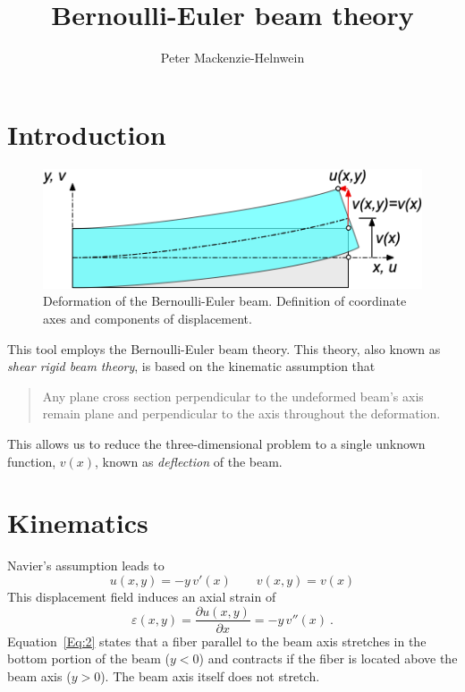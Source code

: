 \documentclass[11pt, oneside]{article}   	%
\title{Bernoulli-Euler beam theory}
\author{Peter Mackenzie-Helnwein}
\begin{document}
\maketitle

\section{Introduction}
\begin{figure}[h]
	\begin{center}
		\includegraphics[scale=0.50]{beam.png}
		\caption{Deformation of the Bernoulli-Euler beam. Definition of coordinate axes and components of displacement.}
	\end{center}
	\label{Fig:1}
\end{figure}
This tool employs the Bernoulli-Euler beam theory.  This theory, also known as \emph{shear rigid beam theory}, is based on the kinematic assumption  that
\begin{quote}
   Any plane cross section perpendicular to the undeformed beam's axis remain plane and perpendicular to the axis throughout the deformation.
\end{quote}
This allows us to reduce the three-dimensional problem to a single unknown function, $v(x)$, known as \emph{deflection} of the beam.

\section{Kinematics}
Navier's assumption leads to
\begin{equation}
	u(x,y) = -y \,v'(x)
	\qquad
	v(x,y) = v(x)
	\label{Eq:1}
\end{equation}
This displacement field induces an axial strain of
\begin{equation}
	\varepsilon(x,y) = \frac{\partial u(x,y)}{\partial x} = -y\, v''(x) ~.
	\label{Eq:2}
\end{equation}
Equation~\eqref{Eq:2} states that a fiber parallel to the beam axis stretches in the bottom portion of the beam ($y<0$) and contracts if the fiber is located above the beam axis ($y>0$).  The beam axis itself  does not stretch.
\end{document}
